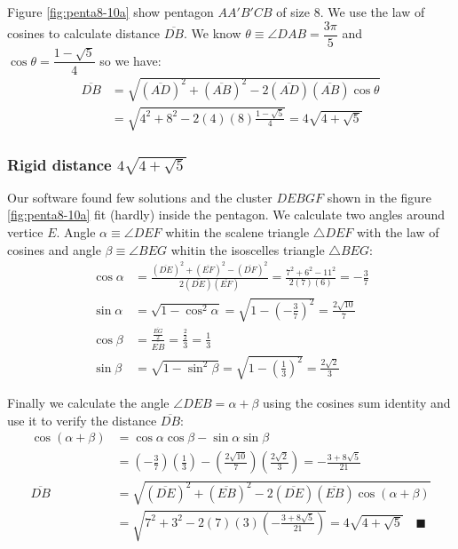 \documentclass[11pt]{article}
\begin{document}
Figure \ref{fig:penta8-10a} show pentagon $AA'B'CB$ of size $8$. We use the law of cosines to calculate distance $\overline{DB}$. We know $\theta \equiv \angle{DAB} = \dfrac{3\pi}5$ and $\cos\theta = \dfrac{1-\sqrt5}4$ so we have:
\begin{align}
\overline{DB} &= \sqrt{(\overline{AD})^2 + (\overline{AB})^2
 - 2(\overline{AD})(\overline{AB})\cos\theta} \nonumber\\
 &= \sqrt{4^2 + 8^2 - 2(4)(8)\frac{1-\sqrt5}4} = 4\sqrt{4 + \sqrt5}
\end{align}

\subsubsection{Rigid distance $4\sqrt{4 + \sqrt5}$}

Our software found few solutions and the cluster $DEBGF$ shown in the figure \ref{fig:penta8-10a} fit (hardly) inside the pentagon. We calculate two angles around vertice $E$. Angle $\alpha \equiv \angle{DEF}$ whitin the scalene triangle $\triangle{DEF}$ with the law of cosines and angle $\beta \equiv \angle{BEG}$ whitin the isoscelles triangle $\triangle{BEG}$:
\begin{align}
\cos\alpha &= \frac{(\overline{DE})^2 + (\overline{EF})^2 - (\overline{DF})^2}
 {2(\overline{DE})(\overline{EF})} 
 = \frac{7^2 + 6^2 - 11^2}{2(7)(6)} = -\frac{3}7 \\
\sin\alpha &= \sqrt{1 - \cos^2\alpha}
 = \sqrt{1 - \left(-\frac{3}{7}\right)^2} = \frac{2\sqrt{10}}7 \\
\cos\beta &= \frac{\frac{\overline{EG}}2}{\overline{EB}}
 = \frac{\frac{2}{2}}{3} = \frac{1}3\\
\sin\beta &= \sqrt{1 - \sin^2{\beta}}
 = \sqrt{1 - \left(\frac{1}3\right)^2} = \frac{2\sqrt2}3
\end{align}

Finally we calculate the angle $\angle{DEB} = \alpha + \beta$ using the cosines sum identity and use it
to verify the distance $\overline{DB}$:
\begin{align}
\cos(\alpha + \beta) &= \cos\alpha\cos\beta - \sin\alpha\sin\beta \nonumber\\
 &= \left(-\frac{3}7\right)\left(\frac{1}3\right)
  - \left(\frac{2\sqrt{10}}7\right)\left(\frac{2\sqrt2}3\right)
  = -\frac{3 + 8\sqrt{5}}{21} \\
%
\overline{DB} &= \sqrt{(\overline{DE})^2 + (\overline{EB})^2
 - 2(\overline{DE})(\overline{EB})\cos(\alpha + \beta)} \nonumber\\
 &= \sqrt{7^2 + 3^2 - 2(7)(3)\left(-\frac{3 + 8\sqrt{5}}{21}\right)} 
 = 4\sqrt{4 + \sqrt5} \quad\blacksquare
\end{align}
\end{document}
